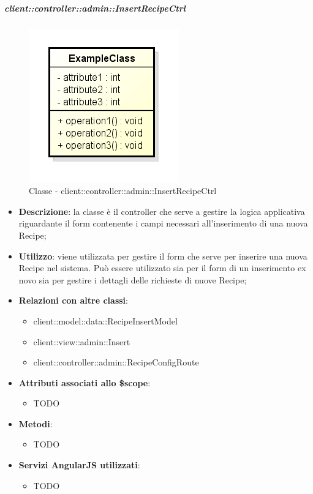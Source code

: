 		\subparagraph{client::controller::admin::InsertRecipeCtrl} %
		\label{subp:bdsm_app_client_controller_admin_insertctrl}
			\begin{figure}[htbp]
				\centering
				\centerline{\includegraphics[scale=0.7]{./images/client/classes/example_class.png}}
				\caption{Classe - client::controller::admin::InsertRecipeCtrl}
			\end{figure}
			\begin{itemize}
				\item \textbf{Descrizione}: la classe è il controller che serve a gestire la logica applicativa riguardante il form contenente i campi necessari all'inserimento di una nuova Recipe;
				\item \textbf{Utilizzo}: viene utilizzata per gestire il form che serve per inserire una nuova Recipe nel sistema. Può essere utilizzato sia per il form di un inserimento ex novo sia per gestire i dettagli delle richieste di nuove Recipe;
				\item \textbf{Relazioni con altre classi}:
					\begin{itemize}
						\item client::model::data::RecipeInsertModel
						\item client::view::admin::Insert
						\item client::controller::admin::RecipeConfigRoute
					\end{itemize}

				\item \textbf{Attributi associati allo \$scope}:
					\begin{itemize}
						\item TODO
					\end{itemize}

				\item \textbf{Metodi}:
					\begin{itemize}
						\item TODO
					\end{itemize}

				\item \textbf{Servizi AngularJS utilizzati}:
					\begin{itemize}
						\item TODO
					\end{itemize}

			\end{itemize}

